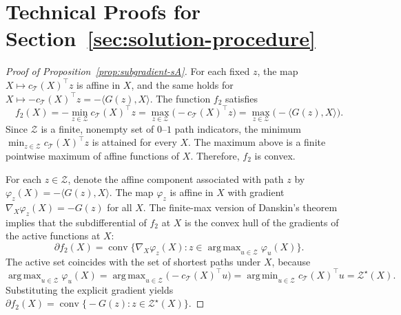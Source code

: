 \documentclass[11pt, letterpaper, oneside, reqno]{amsart}
\DeclareMathOperator*{\argmin}{arg\,min}
\DeclareMathOperator*{\argmax}{arg\,max}
\newcommand{\opt}{^\star}
\newcommand{\inner}[2]{\big \langle #1, #2 \big \rangle }
\begin{document}
\section{Technical Proofs for Section~\ref{sec:solution-procedure}}\label{ec:proofs-solution-procedure}
\begin{proof}[Proof of Proposition~\ref{prop:subgradient-sA}]
For each fixed $z$, the map $X \mapsto c_{\mathcal T}(X)^\top z$ is affine in $X$, and the same holds for $X \mapsto -c_{\mathcal T}(X)^\top z = -\inner{G(z)}{X}$. 
The function $f_2$ satisfies
\[
f_2(X)
= - \min_{z \in \mathcal Z} c_{\mathcal T}(X)^\top z
= \max_{z \in \mathcal Z} \bigl(-c_{\mathcal T}(X)^\top z\bigr)
= \max_{z \in \mathcal Z} \bigl(-\inner{G(z)}{X}\bigr).
\]
Since $\mathcal Z$ is a finite, nonempty set of $0$--$1$ path indicators, the minimum $\min_{z \in \mathcal Z} c_{\mathcal T}(X)^\top z$ is attained for every $X$. The maximum above is a finite pointwise maximum of affine functions of $X$. Therefore, $f_2$ is convex.

For each $z \in \mathcal Z$, denote the affine component associated with path $z$ by
$\varphi_z(X) = -\inner{G(z)}{X}$.
The map $\varphi_z$ is affine in $X$ with gradient $\nabla_X \varphi_z(X) = -G(z)$ for all $X$. The finite-max version of Danskin's theorem~\cite{ref:danskin2012theory} implies that the subdifferential of $f_2$ at $X$ is the convex hull of the gradients of the active functions at $X$:
\[
\partial f_2(X)
= \operatorname{conv} \bigl\{ \nabla_X \varphi_z(X) : z \in \argmax_{u \in \mathcal Z} \varphi_u(X) \bigr\}.
\]
The active set coincides with the set of shortest paths under $X$, because
\[
\argmax_{u \in \mathcal Z} \varphi_u(X)
= \argmax_{u \in \mathcal Z} \bigl(-c_{\mathcal T}(X)^\top u\bigr)
= \argmin_{u \in \mathcal Z} c_{\mathcal T}(X)^\top u
= \mathcal Z\opt(X).
\]
Substituting the explicit gradient yields
$\partial f_2(X) = \operatorname{conv}\bigl\{ -G(z) : z \in \mathcal Z\opt(X) \bigr\}$.
\end{proof}
\end{document}

